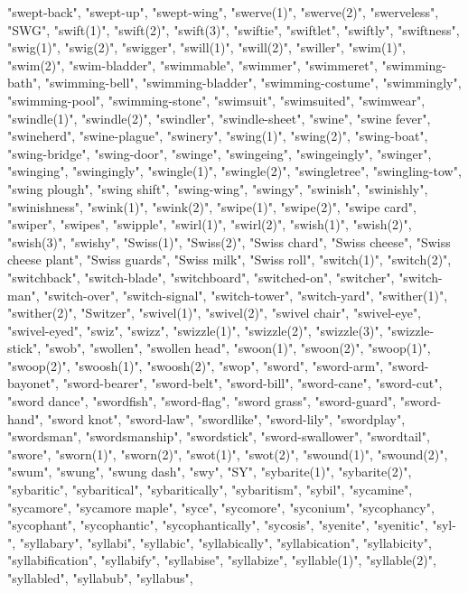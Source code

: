 "swept-back",
"swept-up",
"swept-wing",
"swerve(1)",
"swerve(2)",
"swerveless",
"SWG",
"swift(1)",
"swift(2)",
"swift(3)",
"swiftie",
"swiftlet",
"swiftly",
"swiftness",
"swig(1)",
"swig(2)",
"swigger",
"swill(1)",
"swill(2)",
"swiller",
"swim(1)",
"swim(2)",
"swim-bladder",
"swimmable",
"swimmer",
"swimmeret",
"swimming-bath",
"swimming-bell",
"swimming-bladder",
"swimming-costume",
"swimmingly",
"swimming-pool",
"swimming-stone",
"swimsuit",
"swimsuited",
"swimwear",
"swindle(1)",
"swindle(2)",
"swindler",
"swindle-sheet",
"swine",
"swine fever",
"swineherd",
"swine-plague",
"swinery",
"swing(1)",
"swing(2)",
"swing-boat",
"swing-bridge",
"swing-door",
"swinge",
"swingeing",
"swingeingly",
"swinger",
"swinging",
"swingingly",
"swingle(1)",
"swingle(2)",
"swingletree",
"swingling-tow",
"swing plough",
"swing shift",
"swing-wing",
"swingy",
"swinish",
"swinishly",
"swinishness",
"swink(1)",
"swink(2)",
"swipe(1)",
"swipe(2)",
"swipe card",
"swiper",
"swipes",
"swipple",
"swirl(1)",
"swirl(2)",
"swish(1)",
"swish(2)",
"swish(3)",
"swishy",
"Swiss(1)",
"Swiss(2)",
"Swiss chard",
"Swiss cheese",
"Swiss cheese plant",
"Swiss guards",
"Swiss milk",
"Swiss roll",
"switch(1)",
"switch(2)",
"switchback",
"switch-blade",
"switchboard",
"switched-on",
"switcher",
"switch-man",
"switch-over",
"switch-signal",
"switch-tower",
"switch-yard",
"swither(1)",
"swither(2)",
"Switzer",
"swivel(1)",
"swivel(2)",
"swivel chair",
"swivel-eye",
"swivel-eyed",
"swiz",
"swizz",
"swizzle(1)",
"swizzle(2)",
"swizzle(3)",
"swizzle-stick",
"swob",
"swollen",
"swollen head",
"swoon(1)",
"swoon(2)",
"swoop(1)",
"swoop(2)",
"swoosh(1)",
"swoosh(2)",
"swop",
"sword",
"sword-arm",
"sword-bayonet",
"sword-bearer",
"sword-belt",
"sword-bill",
"sword-cane",
"sword-cut",
"sword dance",
"swordfish",
"sword-flag",
"sword grass",
"sword-guard",
"sword-hand",
"sword knot",
"sword-law",
"swordlike",
"sword-lily",
"swordplay",
"swordsman",
"swordsmanship",
"swordstick",
"sword-swallower",
"swordtail",
"swore",
"sworn(1)",
"sworn(2)",
"swot(1)",
"swot(2)",
"swound(1)",
"swound(2)",
"swum",
"swung",
"swung dash",
"swy",
"SY",
"sybarite(1)",
"sybarite(2)",
"sybaritic",
"sybaritical",
"sybaritically",
"sybaritism",
"sybil",
"sycamine",
"sycamore",
"sycamore maple",
"syce",
"sycomore",
"syconium",
"sycophancy",
"sycophant",
"sycophantic",
"sycophantically",
"sycosis",
"syenite",
"syenitic",
"syl-",
"syllabary",
"syllabi",
"syllabic",
"syllabically",
"syllabication",
"syllabicity",
"syllabification",
"syllabify",
"syllabise",
"syllabize",
"syllable(1)",
"syllable(2)",
"syllabled",
"syllabub",
"syllabus",
